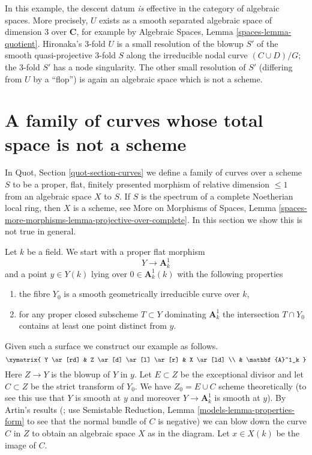 \noindent
In this example, the descent datum {\it is }effective in the category
of algebraic spaces. More precisely,
$U$ exists as a smooth separated algebraic space
of dimension 3 over ${\mathbf C}$,
for example by Algebraic Spaces, Lemma \ref{spaces-lemma-quotient}.
Hironaka's 3-fold $U$ is a small resolution of the blowup $S'$
of the smooth quasi-projective 3-fold $S$ along the irreducible nodal curve
$(C\cup D)/G$; the 3-fold $S'$ has a node singularity. The
other small resolution of $S'$ (differing from $U$ by a ``flop'')
is again an algebraic space which is not a scheme.






\section{A family of curves whose total space is not a scheme}
\label{section-family-of-curves}

\noindent
In Quot, Section \ref{quot-section-curves} we define a family of curves over
a scheme $S$ to be a proper, flat, finitely presented morphism
of relative dimension $\leq 1$ from an algebraic space $X$ to $S$.
If $S$ is the spectrum of a complete Noetherian local ring, then
$X$ is a scheme, see
More on Morphisms of Spaces, Lemma
\ref{spaces-more-morphisms-lemma-projective-over-complete}.
In this section we show this is not true in general.

\medskip\noindent
Let $k$ be a field. We start with a proper flat morphism
$$
Y \longrightarrow \mathbf{A}^1_k
$$
and a point $y \in Y(k)$ lying over $0 \in \mathbf{A}^1_k(k)$
with the following properties
\begin{enumerate}
\item the fibre $Y_0$ is a smooth geometrically irreducible curve over $k$,
\item for any proper closed subscheme $T \subset Y$ dominating
$\mathbf{A}^1_k$ the intersection $T \cap Y_0$ contains at least one point
distinct from $y$.
\end{enumerate}
Given such a surface we construct our example as follows.
$$
\xymatrix{
Y \ar[rd] & Z \ar[d] \ar[l] \ar[r] & X \ar[ld] \\
& \mathbf{A}^1_k
}
$$
Here $Z \to Y$ is the blowup of $Y$ in $y$. Let $E \subset Z$ be the
exceptional divisor and let $C \subset Z$ be the strict transform of $Y_0$.
We have $Z_0 = E \cup C$ scheme theoretically (to see this use that
$Y$ is smooth at $y$ and moreover $Y \to \mathbf{A}^1_k$ is smooth at $y$).
By Artin's results (\cite{ArtinII}; use
Semistable Reduction, Lemma \ref{models-lemma-properties-form}
to see that the normal bundle of $C$ is negative)
we can blow down the curve $C$ in $Z$ to obtain an algebraic space $X$
as in the diagram. Let $x \in X(k)$ be the image of $C$.

